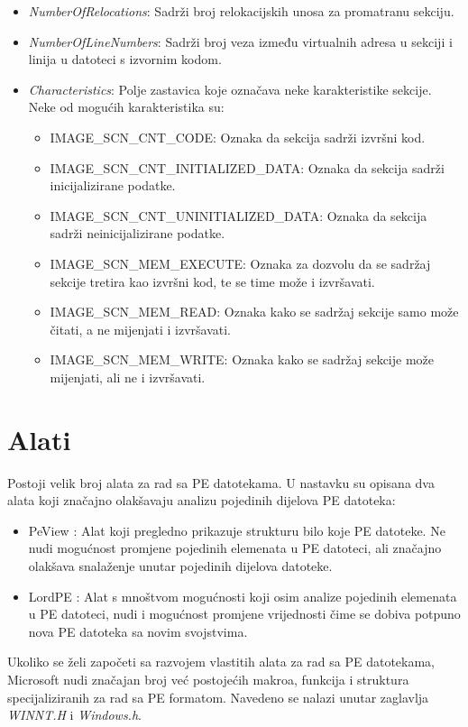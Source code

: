 \documentclass[times, utf8, diplomski, numeric]{fer}
\begin{document}
\begin{itemize}
\item \emph{NumberOfRelocations}: Sadrži broj relokacijskih unosa
za promatranu sekciju.

\item \emph{NumberOfLineNumbers}: Sadrži broj veza između
virtualnih adresa u sekciji i linija u datoteci s izvornim kodom.

\item \emph{Characteristics}: Polje zastavica koje označava neke
karakteristike sekcije. Neke od mogućih karakteristika su:

\begin{itemize}
\item IMAGE\_SCN\_CNT\_CODE: Oznaka da sekcija
sadrži izvršni kod.

\item IMAGE\_SCN\_CNT\_INITIALIZED\_DATA:
Oznaka da sekcija sadrži inicijalizirane podatke.

\item IMAGE\_SCN\_CNT\_UNINITIALIZED\_DATA: Oznaka da sekcija sadrži
neinicijalizirane podatke.

\item IMAGE\_SCN\_MEM\_EXECUTE: Oznaka za dozvolu da se sadržaj
sekcije tretira kao izvršni kod, te se time može i izvršavati.

\item IMAGE\_SCN\_MEM\_READ: Oznaka kako se sadržaj sekcije samo
može čitati, a ne mijenjati i izvršavati.

\item IMAGE\_SCN\_MEM\_WRITE: Oznaka kako se sadržaj
sekcije može mijenjati, ali ne i izvršavati.
\end{itemize}

\end{itemize}


\section{Alati}

Postoji velik broj alata za rad sa PE datotekama. U nastavku su 
opisana dva alata koji značajno olakšavaju analizu pojedinih dijelova
PE datoteka:

\begin{itemize}
\item PeView \citep{peview}: Alat koji pregledno prikazuje strukturu bilo koje
PE datoteke. Ne nudi mogućnost promjene pojedinih elemenata u PE
datoteci, ali značajno olakšava snalaženje unutar pojedinih
dijelova datoteke.

\item LordPE \citep{lordpe}: Alat s mnoštvom mogućnosti koji osim analize pojedinih elemenata 
u PE datoteci, nudi i mogućnost promjene vrijednosti čime se dobiva
potpuno nova PE datoteka sa novim svojstvima.
\end{itemize}
Ukoliko se želi započeti sa razvojem vlastitih alata za rad sa PE datotekama,
Microsoft nudi značajan broj već postojećih makroa, funkcija i
struktura specijaliziranih za rad sa PE formatom. Navedeno se
nalazi unutar zaglavlja \emph{WINNT.H} i \emph{Windows.h}.
\end{document}
